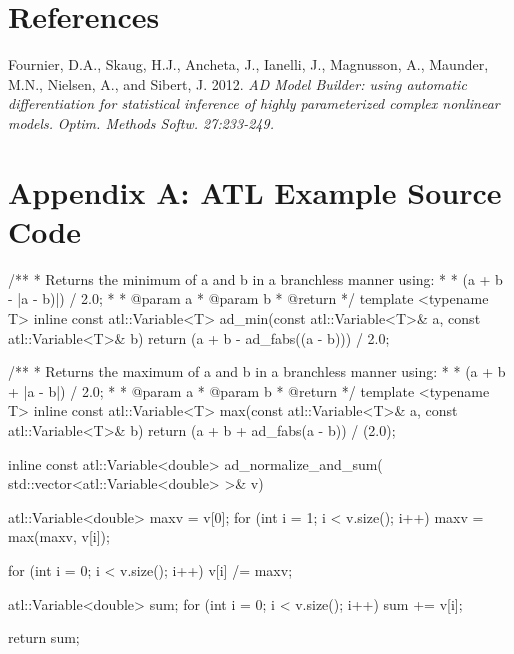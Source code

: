 \documentclass[oneside]{article}
\begin{document}
\section{References}
\begin{thebibliography}{9}

Fournier, D.A., Skaug, H.J., Ancheta, J., Ianelli, J., Magnusson, A., Maunder, M.N., Nielsen, A., and Sibert, J. 2012.
\textit{AD Model Builder: using automatic differentiation for statistical inference of highly parameterized complex nonlinear models.}
\textit{Optim. Methods Softw. 27:233-249.}

\end{thebibliography}
\section{Appendix A: ATL Example Source Code}

\begin{cppsource}

/**
 * Returns the minimum of a and b in a branchless manner using:
 *
 * (a + b - |a - b)|) / 2.0;
 *
 * @param a
 * @param b
 * @return
 */
template <typename T>
inline const atl::Variable<T> ad_min(const atl::Variable<T>& a,
const atl::Variable<T>& b) {
    return (a + b - ad_fabs((a - b))) / 2.0;
}

/**
 * Returns the maximum of a and b in a branchless manner using:
 *
 * (a + b + |a - b|) / 2.0;
 *
 * @param a
 * @param b
 * @return
 */
template <typename T>
inline const atl::Variable<T> max(const atl::Variable<T>& a,
 const atl::Variable<T>& b) {
    return (a + b + ad_fabs(a - b)) / (2.0);
}


inline const atl::Variable<double> ad_normalize_and_sum(
std::vector<atl::Variable<double> >& v) {
    atl::Variable<double> maxv = v[0];
    for (int i = 1; i < v.size(); i++) {
        maxv = max(maxv, v[i]);
    }

    for (int i = 0; i < v.size(); i++) {
        v[i] /= maxv;
    }

    atl::Variable<double> sum;
    for (int i = 0; i < v.size(); i++) {
        sum += v[i];
    }

    return sum;
}
\end{cppsource}
\end{document}
